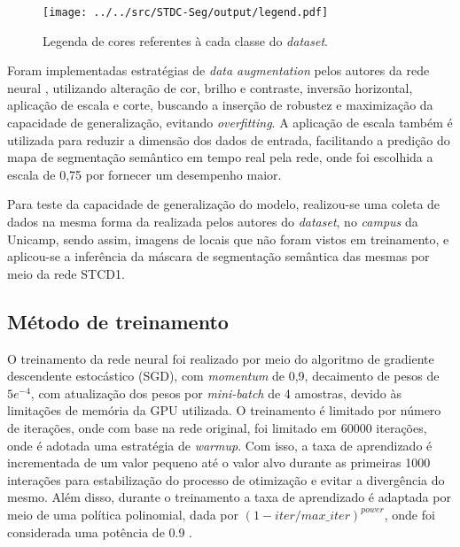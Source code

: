\documentclass[conference]{IEEEtran}
\begin{document}
\begin{figure}[h!]
	\centering
	\texttt{[image: ../../src/STDC-Seg/output/legend.pdf]}
	\caption{Legenda de cores referentes à cada classe do \textit{dataset}.}
	\label{fig:legend}
\end{figure}

Foram implementadas estratégias de \textit{data augmentation} pelos autores da rede neural \cite{fan2021RethinkingBiSeNetRealtime}, utilizando alteração de cor, brilho e contraste, inversão horizontal, aplicação de escala e corte, buscando a inserção de robustez e maximização da capacidade de generalização, evitando \textit{overfitting}. A aplicação de escala também é utilizada para reduzir a dimensão dos dados de entrada, facilitando a predição do mapa de segmentação semântico em tempo real pela rede, onde foi escolhida a escala de 0,75 por fornecer um desempenho maior.

Para teste da capacidade de generalização do modelo, realizou-se uma coleta de dados na mesma forma da realizada pelos autores do \textit{dataset}, no \textit{campus} da Unicamp, sendo assim, imagens de locais que não foram vistos em treinamento, e aplicou-se a inferência da máscara de segmentação semântica das mesmas por meio da rede STCD1.

\subsection{Método de treinamento}


O treinamento da rede neural foi realizado por meio do algoritmo de gradiente descendente estocástico (SGD), com \textit{momentum} de 0,9, decaimento de pesos de $5e^{-4}$, com atualização dos pesos por \textit{mini-batch} de 4 amostras, devido às limitações de memória da GPU utilizada. O treinamento é limitado por número de iterações, onde com base na rede original, foi limitado em 60000 iterações, onde é adotada uma estratégia de \textit{warmup}. Com isso, a taxa de aprendizado é incrementada de um valor pequeno até o valor alvo durante as primeiras 1000 interações para estabilização do processo de otimização e evitar a divergência do mesmo. Além disso, durante o treinamento a taxa de aprendizado é adaptada por meio de uma política polinomial, dada por $(1 - iter/max\_iter)^{power}$, onde foi considerada uma potência de 0.9 \cite{fan2021RethinkingBiSeNetRealtime}.
\end{document}
